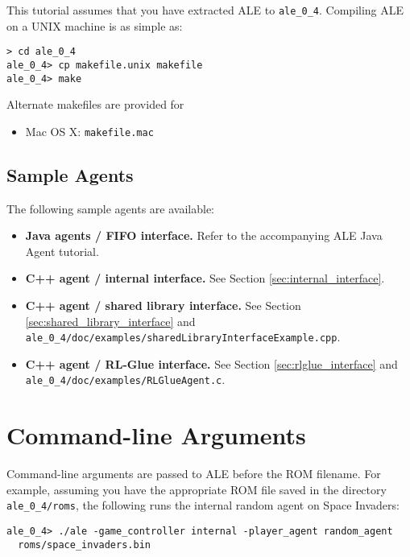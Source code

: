 \documentclass[12pt]{article}
\begin{document}
This tutorial assumes that you have extracted ALE to \verb+ale_0_4+. Compiling
ALE on a UNIX machine is as simple as:

\begin{verbatim}
> cd ale_0_4
ale_0_4> cp makefile.unix makefile
ale_0_4> make
\end{verbatim}

Alternate makefiles are provided for 

\begin{itemize}
  \item{Mac OS X: \verb+makefile.mac+}
\end{itemize}

\subsection{Sample Agents}

The following sample agents are available:

\begin{itemize}
  \item{\textbf{Java agents / FIFO interface.} Refer to the accompanying ALE Java Agent tutorial.}
  \item{\textbf{C++ agent / internal interface.} See Section \ref{sec:internal_interface}.}
  \item{\textbf{C++ agent / shared library interface.} See Section \ref{sec:shared_library_interface} and \\ 
    \verb+ale_0_4/doc/examples/sharedLibraryInterfaceExample.cpp+.}
  \item{\textbf{C++ agent / RL-Glue interface.} See Section \ref{sec:rlglue_interface} and \\
    \verb+ale_0_4/doc/examples/RLGlueAgent.c+.}
\end{itemize}

\section{Command-line Arguments}

Command-line arguments are passed to ALE before the ROM filename. For example, assuming you
have the appropriate ROM file saved in the directory \verb+ale_0_4/roms+, the following runs
the internal random agent on Space Invaders:

\begin{verbatim}
ale_0_4> ./ale -game_controller internal -player_agent random_agent  
  roms/space_invaders.bin
\end{verbatim}
\end{document}
